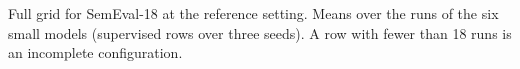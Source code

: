 \begin{table}[t]
  \centering
  \footnotesize
  
  \caption{Full grid for SemEval-18 at the reference setting. Means over the runs of the six small models (supervised rows over three seeds). A row with fewer than 18 runs is an incomplete configuration.}
  \label{tab:grid_semeval}
\end{table}
